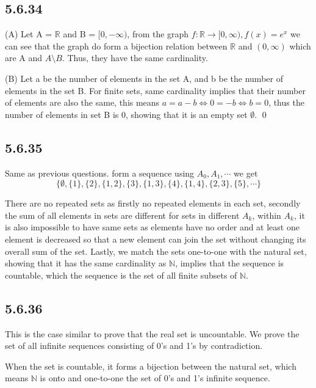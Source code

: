 \documentclass{article}
\begin{document}
\subsection*{5.6.34}

(A) Let A = $\mathbb{R}$ and B = $[0,-\infty)$, from the graph $f:\mathbb{R}\rightarrow [0,\infty), f(x)=e^x$ we can see that the graph do form a bijection relation between $\mathbb{R}$ and $(0,\infty)$ which are A and $A\setminus B$. Thus, they have the same cardinality. 

(B) Let a be the number of elements in the set A, and b be the number of elements in the set B. For finite sets, same cardinality implies that their number of elements are also the same, this means $a=a-b \iff 0=-b \iff b=0$, thus the number of elements in set B is 0, showing that it is an empty set $\emptyset$. \qed

\subsection*{5.6.35}

Same as previous questions. form a sequence using $A_0, A_1,\cdots$ we get $$\{\emptyset, \{1\}, \{2\}, \{1,2\},\{3\},\{1,3\},\{4\},\{1,4\},\{2,3\},\{5\},\cdots\}$$

There are no repeated sets as firstly no repeated elements in each set, secondly the sum of all elements in sets are different for sets in different $A_k$, within $A_k$, it is also impossible to have same sets as elements have no order and at least one element is decreased so that a new element can join the set without changing its overall sum of the set. Lastly, we match the sets one-to-one with the natural set, showing that it has the same cardinality as $\mathbb{N}$, implies that the sequence is countable, which the sequence is the set of all finite subsets of $\mathbb{N}$. 

\subsection*{5.6.36}

This is the case similar to prove that the real set is uncountable. We prove the set of all infinite sequences consisting of 0's and 1's by contradiction.

When the set is countable, it forms a bijection between the natural set, which means $\mathbb{N}$ is onto and one-to-one the set of 0's and 1's infinite sequence. 
\end{document}
